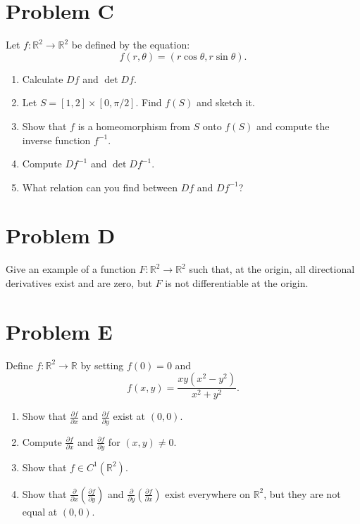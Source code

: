 \documentclass[lang=cn,11pt]{template}
\begin{document}
\section*{Problem C}
Let \( f : \mathbb{R}^2 \to \mathbb{R}^2 \) be defined by the equation:
\[
f(r, \theta) = (r \cos \theta, r \sin \theta).
\]
\begin{enumerate}
    \item Calculate \( Df \) and \( \det Df \).
    \item Let \( S = [1, 2] \times [0, \pi/2] \). Find \( f(S) \) and sketch it.
    \item Show that \( f \) is a homeomorphism from \( S \) onto \( f(S) \) and compute the inverse function \( f^{-1} \).
    \item Compute \( Df^{-1} \) and \( \det Df^{-1} \).
    \item What relation can you find between \( Df \) and \( Df^{-1} \)?
\end{enumerate}

\section*{Problem D}
Give an example of a function \( F : \mathbb{R}^2 \to \mathbb{R}^2 \) such that, at the origin, all directional derivatives exist and are zero, but \( F \) is not differentiable at the origin.

\section*{Problem E}
Define \( f : \mathbb{R}^2 \to \mathbb{R} \) by setting \( f(0) = 0 \) and
\[
f(x, y) = \frac{xy(x^2 - y^2)}{x^2 + y^2}.
\]
\begin{enumerate}
    \item Show that \( \frac{\partial f}{\partial x} \) and \( \frac{\partial f}{\partial y} \) exist at \( (0, 0) \).
    \item Compute \( \frac{\partial f}{\partial x} \) and \( \frac{\partial f}{\partial y} \) for \( (x, y) \neq 0 \).
    \item Show that \( f \in C^1(\mathbb{R}^2) \).
    \item Show that \( \frac{\partial}{\partial x} \left( \frac{\partial f}{\partial y} \right) \) and \( \frac{\partial}{\partial y} \left( \frac{\partial f}{\partial x} \right) \) exist everywhere on \( \mathbb{R}^2 \), but they are not equal at \( (0, 0) \).
\end{enumerate}
\end{document}
